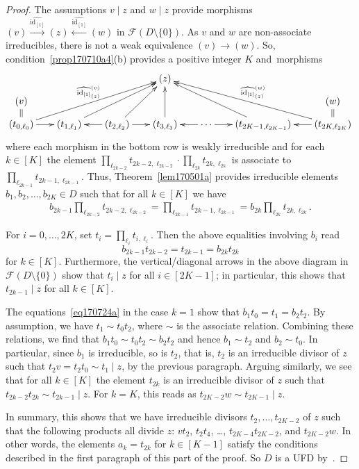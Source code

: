 \documentclass[reqno]{amsart}
\theoremstyle{plain}
\theoremstyle{definition}
\newcommand{\cat}[1]{\mathcal{#1}}
\newcommand{\catf}{\cat{F}}
\newcommand{\id}{\operatorname{id}}
\newcommand{\xra}{\xrightarrow}
\newcommand{\xla}{\xleftarrow}
\numberwithin{equation}{lem}
\begin{document}
\begin{proof}
The assumptions $v\mid z$ and $w\mid z$ provide morphisms $(v)\xra{\widehat{\id_{[1]}}}(z)\xla{\widehat{\id_{[1]}}}(w)$
in $\catf(D\setminus\{0\})$.
As $v$ and $w$ are non-associate irreducibles, there is not a weak equivalence $(v)\to(w)$.
So, condition~\eqref{prop170710a4}(b)
provides a positive integer $K$ and~morphisms
$$\xymatrix@C=6.3mm@R=2.5mm{
&&&(z)
\\ 
(v)&&&&&&(w)
\\
(t_{0,\ell_0})\ar[r]\ar[rrruu]^{\widehat{\id_{[1]}}^{(v)}_{(z)}}
\ar@{=}[u]
&(t_{1,\ell_1})\ar[rruu]
&(t_{2,\ell_2})\ar[r]\ar[l]\ar[ruu]
&(t_{3,\ell_3})\ar[uu]
&\cdots\ar[r]\ar[l]
&(t_{2K-1,\ell_{2K-1}})\ar[lluu]
&(t_{2K,\ell_{2K}})\ar[l]\ar[llluu]_{\widehat{\id_{[1]}}^{(w)}_{(z)}}\ar@{=}[u]
}$$
where each morphism in the bottom row  is weakly irreducible and
for each $k\in [K]$ the element $\prod_{\ell_{2k-2}}t_{2k-2,\ell_{2k-2}}\cdot\prod_{\ell_{2k}}t_{2k,\ell_{2k}}$ is associate
to $\prod_{\ell_{2k-1}}t_{2k-1,\ell_{2k-1}}$.
Thus, 
Theorem~\ref{lem170501a} provides irreducible elements 
$b_1,b_2,\ldots,b_{2K}\in D$ such that
for 
all $k\in[K]$
we have
\begin{gather*}
\textstyle
b_{2k-1}\prod_{\ell_{2k-2}}t_{2k-2,\ell_{2k-2}}=\prod_{\ell_{2k-1}}t_{2k-1,\ell_{2k-1}}=b_{2k}\prod_{\ell_{2k}}t_{2k,\ell_{2k}}.
\end{gather*}

For  $i=0,\ldots,2K$, set $t_i=\prod_{\ell_i}t_{i,\ell_i}$.
Then the above equalities involving $b_i$ read 
\begin{equation}\label{eq170724a}
b_{2k-1}t_{2k-2}=t_{2k-1}=b_{2k}t_{2k}
\end{equation}
for $k\in[K]$.
Furthermore, 
the vertical/diagonal arrows in the above diagram in $\catf(D\setminus\{0\})$
show that $t_i\mid z$ for all $i\in[2K-1]$; in particular, this shows that $t_{2k-1}\mid z$ for all $k\in [K]$.

The equations~\eqref{eq170724a} in the case $k=1$ show that 
$b_1t_0=t_1=b_2t_2$.
By assumption, we have $t_1\sim t_0t_2$, where $\sim$ is the associate relation. 
Combining these relations, we find that
$b_1t_0\sim t_0t_2\sim b_2t_2$ and hence $b_1\sim t_2$ and $b_2\sim t_0$.
In particular, since $b_1$ is irreducible, so is $t_2$, that is, $t_2$ is an irreducible divisor of $z$ such that $t_2v=t_2t_0\sim t_1\mid z$,
by the previous paragraph. 
Arguing similarly, we see that for all $k\in [K]$ the element $t_{2k}$ is an irreducible divisor of $z$ such that $t_{2k-2}t_{2k}\sim t_{2k-1}\mid z$.
For $k=K$, this reads as $t_{2K-2}w\sim t_{2K-1}\mid z$.

In summary, this shows that we have irreducible divisors $t_2,\ldots,t_{2K-2}$ of $z$
such that the following products all divide $z$: $vt_2$, $t_2t_4$, \ldots, $t_{2K-4}t_{2K-2}$, and $t_{2K-2}w$.
In other words, the elements $a_k=t_{2k}$ for $k\in[K-1]$ satisfy the conditions described in the first paragraph of this part of the proof.
So $D$ is a UFD by~\cite[Theorem~5.1]{coykendall:idg}.
\end{proof}
\end{document}
